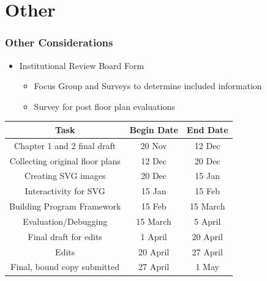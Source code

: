 \documentclass[hyperref={pdfpagelabels=false}]{beamer}
\begin{document}
\section{Other} 
\hypertarget{Other}{{}}
\begin{frame}
\frametitle{Other Considerations}
\begin{itemize}
	\item Institutional Review Board Form
	\begin{itemize}
		\item Focus Group and Surveys to determine included information
		\item Survey for post floor plan evaluations
	\end{itemize}
\end{itemize}

\begin{table}[htbp]
  \centering
  \begin{tabular}{|c||c|c|}
    \hline
    \bf Task     & \bf Begin Date & \bf End Date \\ \hline\hline    
    Chapter 1 and 2 final draft & 20 Nov        & 12 Dec     \\ \hline
    Collecting original floor plans & 12 Dec   & 20 Dec      \\ \hline
    Creating SVG images	     & 20 Dec        & 15 Jan       \\ \hline
    Interactivity for SVG      & 15 Jan         & 15 Feb        \\ \hline
    Building Program Framework & 15 Feb 		 & 15 March		\\ \hline
    Evaluation/Debugging		& 15 March		 & 5 April		\\ \hline
    Final draft for edits	     & 1 April        & 20 April     \\ \hline
    Edits 			             & 20 April       & 27 April     \\ \hline
	Final, bound copy submitted & 27 April       & 1 May         \\ \hline
  \end{tabular}
\end{table} 
\end{frame}
\end{document}
